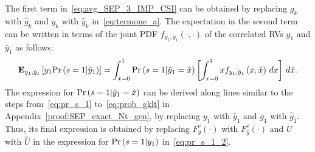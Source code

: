 \documentclass[12pt,draftcls,peerreview,onecolumn]{IEEEtran}
\newcommand{\brac}[1]{\left({#1}\right)}
\newcommand{\explow}[2]{{\bf{E}}_{#1}\left[{#2}\right]}
\newcommand{\prob}[1]{\text{Pr}\brac{#1}}
\newcommand{\given}{\arrowvert}
\newcommand{\puch}{g}
\newcommand{\gk}[1]{{\puch_{#1}}}
\newcommand{\yk}[1]{y_{#1}}
\newcommand{\un}{U}
\newcommand{\unhat}{\widehat{\un}}
\newcommand{\ghat}{\hat{\puch}}
\newcommand{\yhat}{\hat{y}}
\newcommand{\gkhat}[1]{\ghat_{#1}}
\newcommand{\ykhat}[1]{\hat{y}_{#1}}
\newcommand{\ccdfyrv}[1]{ F^{c}_{y}\left(#1 \right) }
\newcommand{\ccdfyhatrv}[1]{F^{c}_{\yhat}\left(#1 \right) }
\newcommand{\xhat}{\hat{x}}
\begin{document}
The first term in~\eqref{eq:avg_SEP_3_IMP_CSI} can be obtained by replacing $\gk{k}$ with $\gkhat{k}$ and $\yk{k}$ with $\ykhat{k}$ in~\eqref{eq:termone_a}. The expectation in the second term can be written in terms of the joint PDF $f_{\yk{1},\ykhat{1}}\left(\cdot,\cdot\right)$ of the correlated RVs $\yk{1}$ and $\ykhat{1}$ as follows:
%
\begin{equation}
\label{eq:avg_SEP_4_IMP_CSI}
\explow{\yk{1},\ykhat{1}}{\yk{1}\prob{s=1\given \ykhat{1}}}= \int_{\xhat=0}^{1} \prob{s=1\given \ykhat{1}=\xhat} \left[ \int_{x=0}^{1} x  f_{\yk{1},\ykhat{1}}\left(x,\xhat\right)\,dx\right] \,d\xhat.
\end{equation}
%
The expression for $\prob{s=1\given\ykhat{1}=\xhat}$ can be derived along lines similar to the steps from~\eqref{eq:pr_s_1} to~\eqref{eq:prob_gklt} in Appendix~\ref{proof:SEP_exact_Nt_gen}, by replacing $\yk{1}$ with $\ykhat{1}$ and $\gk{1}$ with $\gkhat{1}$. Thus, its final expression is obtained by replacing $\ccdfyrv{\cdot}$ with $\ccdfyhatrv{\cdot}$ and $\un$  with $\unhat$ in the expression for  $\prob{s=1\given\yk{1}}$ in~\eqref{eq:pr_s_1_2}. 
\end{document}

